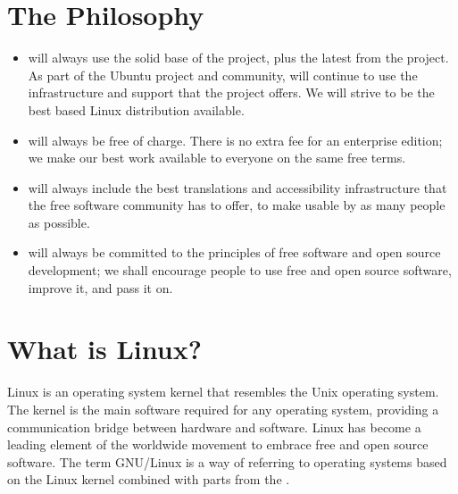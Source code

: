 \documentclass[letterpaper,10pt,english]{sphinxmanual}
\begin{document}
\section{The  Philosophy}
\label{\detokenize{welcome:the-kubuntu-philosophy}}\begin{itemize}
\item {} 
 will always use the solid base of the  project, plus the latest from the  project. As part of the Ubuntu project and community,  will continue to use the infrastructure and support that the  project offers. We will strive to be the best  based Linux distribution available.

\item {} 
 will always be free of charge. There is no extra fee for an enterprise edition; we make our best work available to everyone on the same free terms.

\item {} 
 will always include the best translations and accessibility infrastructure that the free software community has to offer, to make  usable by as many people as possible.

\item {} 
 will always be committed to the principles of free software and open source development; we shall encourage people to use free and open source software, improve it, and pass it on.

\end{itemize}


\section{What is Linux?}
\label{\detokenize{welcome:what-is-linux}}
Linux is an operating system kernel that resembles the Unix operating system. The kernel is the main software required for any operating system, providing a communication bridge between hardware and software. Linux has become a leading element of the worldwide movement to embrace free and open source software. The term \sphinxquotedblleft{}GNU/Linux\sphinxquotedblright{} is a way of referring to operating systems based on the Linux kernel combined with parts from the .
\end{document}
